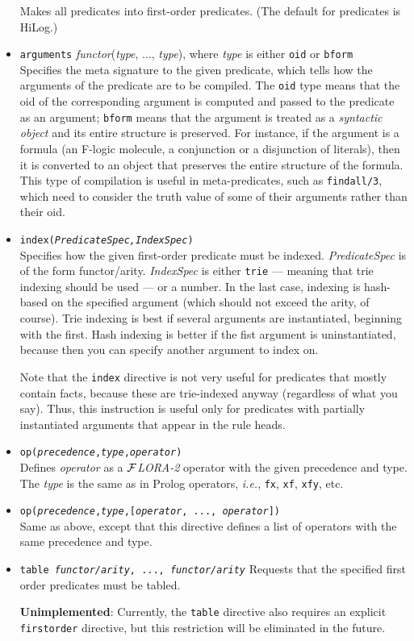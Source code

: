 \documentclass[11pt]{article}
\newcommand{\FLORA}{{\mbox{${\cal F}${\small\it LORA}\rm\emph{-2}}}\xspace}
\newcommand{\fl}{\mbox{F-logic}\xspace}
\begin{document}
\begin{itemize}
  Makes all predicates into first-order predicates. (The default for predicates
  is HiLog.)
\item {\tt arguments} \emph{functor}(\emph{type}, ..., \emph{type}), where
  \emph{type} is either {\tt oid} or {\tt bform}
  \\
  Specifies the meta signature to the given predicate, which tells how the
  arguments of the predicate are to be compiled. The {\tt oid} type means
  that the oid of the corresponding argument is computed and passed to the
  predicate as an argument; {\tt bform} means that the argument is treated
  as a \emph{syntactic object} and its entire structure is preserved. For
  instance, if the argument is a formula (an \fl molecule, a conjunction or
  a disjunction of literals), then it is converted to an object that
  preserves the entire structure of the formula.  This type of compilation
  is useful in meta-predicates, such as {\tt findall/3}, which need to
  consider the truth value of some of their arguments rather than their
  oid.
\item {\tt index({\it PredicateSpec,IndexSpec})}
  \\
  Specifies how the given first-order predicate must be indexed.
  {\em PredicateSpec} is of the form functor/arity. \emph{IndexSpec} is
  either {\tt trie} --- meaning that trie indexing should be used --- or a
  number. In the last case, indexing is hash-based on the specified
  argument (which should not exceed the arity, of course).
  Trie indexing is best if several arguments are instantiated, beginning
  with the first. Hash indexing is better if the fist argument is
  uninstantiated, because then you can specify another argument to index
  on.
  
  Note that the {\tt index} directive is not very useful for predicates
  that mostly contain facts, because these are trie-indexed anyway
  (regardless of what you say). Thus, this instruction is useful only for
  predicates with partially instantiated arguments that appear in the rule
  heads.
\item {\tt op({\it precedence},{\it type},{\it operator})}
  \\
  Defines \emph{operator} as a \FLORA operator with the given precedence
  and type. The \emph{type} is the same as in Prolog operators, {\it i.e.},
  {\tt fx}, {\tt xf}, {\tt xfy}, etc.
\item {\tt op({\it precedence},{\it type},[{\it operator}, ..., {\it operator}])}
  \\
  Same as above, except that this directive defines a list of operators
  with the same precedence and type.
\item {\tt table {\it functor/arity}, ..., {\it functor/arity}}
  Requests that the specified first order predicates must be tabled.
  
  {\bf Unimplemented}: Currently, the {\tt table} directive also requires
  an explicit {\tt firstorder} directive, but this restriction will be
  eliminated in the future.
\end{itemize}
\end{document}
